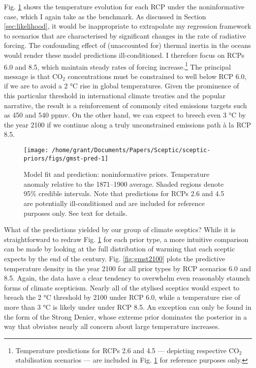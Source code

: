 \documentclass[smallextended]{svjour3}       %
\begin{document}
Fig. \ref{fig:gmst-pred} shows the temperature evolution for each RCP
under the noninformative case, which I again take as the benchmark. As
discussed in Section \ref{sec:likelihood}, it would be inappropriate to
extrapolate my regression framework to scenarios that are characterised
by significant changes in the rate of radiative forcing. The confounding
effect of (unaccounted for) thermal inertia in the oceans would render
these model predictions ill-conditioned. I therefore focus on RCPs 6.0
and 8.5, which maintain steady rates of forcing increase.\footnote{Temperature
  predictions for RCPs 2.6 and 4.5 --- depicting respective CO\(_2\)
  stabilisation scenarios --- are included in Fig. \ref{fig:gmst-pred}
  for reference purposes only.} The principal message is that CO\(_2\)
concentrations must be constrained to well below RCP 6.0, if we are to
avoid a 2 °C rise in global temperatures. Given the prominence of this
particular threshold in international climate treaties and the popular
narrative, the result is a reinforcement of commonly cited emissions
targets such as 450 and 540 ppmv. On the other hand, we can expect to
breech even 3 °C by the year 2100 if we continue along a truly
unconstrained emissions path à la RCP 8.5.

\begin{figure}

{\centering \texttt{[image: /home/grant/Documents/Papers/Sceptic/sceptic-priors/figs/gmst-pred-1]} 

}

\caption{Model fit and prediction: noninformative priors. Temperature anomaly relative to the 1871--1900 average. Shaded regions denote 95\% credible intervals. Note that predictions for RCPs 2.6 and 4.5 are potentially ill-conditioned and are included for reference purposes only. See text for details.}\label{fig:gmst-pred}
\end{figure}

What of the predictions yielded by our group of climate sceptics? While
it is straightforward to redraw Fig. \ref{fig:gmst-pred} for each prior
type, a more intuitive comparison can be made by looking at the full
distribution of warming that each sceptic expects by the end of the
century. Fig. \ref{fig:gmst2100} plots the predictive temperature
density in the year 2100 for all prior types by RCP scenarios 6.0 and
8.5. Again, the data have a clear tendency to overwhelm even reasonably
staunch forms of climate scepticism. Nearly all of the stylised sceptics
would expect to breach the 2 °C threshold by 2100 under RCP 6.0, while a
temperature rise of more than 3 °C is likely under under RCP 8.5. An
exception can only be found in the form of the Strong Denier, whose
extreme prior dominates the posterior in a way that obviates nearly all
concern about large temperature increases.
\end{document}
